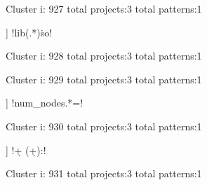 Cluster i: 927
total projects:3
total patterns:1
\begin{multicols}{1}
\begin{description}[noitemsep,topsep=0pt]
\item [[3] ] \cverb!lib(.*)\.so!
\end{description}
\end{multicols}







Cluster i: 928
total projects:3
total patterns:1
\begin{multicols}{1}
\begin{description}[noitemsep,topsep=0pt]
\item [[3] ] \cverb!^\${\d+\/!
\end{description}
\end{multicols}







Cluster i: 929
total projects:3
total patterns:1
\begin{multicols}{1}
\begin{description}[noitemsep,topsep=0pt]
\item [[3] ] \cverb!num_nodes.*=!
\end{description}
\end{multicols}







Cluster i: 930
total projects:3
total patterns:1
\begin{multicols}{1}
\begin{description}[noitemsep,topsep=0pt]
\item [[3] ] \cverb!\d+ (\d+):!
\end{description}
\end{multicols}







Cluster i: 931
total projects:3
total patterns:1
\begin{multicols}{1}
\begin{description}[noitemsep,topsep=0pt]
\item [[3] ] \cverb!^[0-9]+[Ee]$!
\end{description}
\end{multicols}







